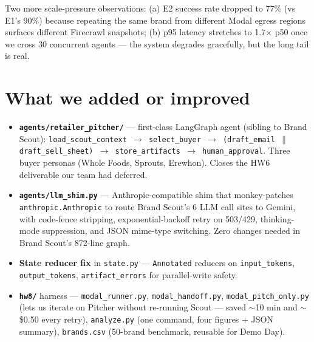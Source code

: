 \documentclass[9pt]{extarticle}
\begin{document}
Two more scale-pressure observations: (a) E2 success rate dropped to 77\% (vs E1's 90\%) because repeating the same brand from different Modal egress regions surfaces different Firecrawl snapshots; (b) p95 latency stretches to 1.7$\times$ p50 once we cross 30 concurrent agents --- the system degrades gracefully, but the long tail is real.

\section*{What we added or improved}
\begin{itemize}
  \item \textbf{\texttt{agents/retailer\_pitcher/}} --- first-class LangGraph agent (sibling to Brand Scout): \texttt{load\_scout\_context $\to$ select\_buyer $\to$ (draft\_email $\parallel$ draft\_sell\_sheet) $\to$ store\_artifacts $\to$ human\_approval}. Three buyer personas (Whole Foods, Sprouts, Erewhon). Closes the HW6 deliverable our team had deferred.
  \item \textbf{\texttt{agents/llm\_shim.py}} --- Anthropic-compatible shim that monkey-patches \texttt{anthropic.Anthropic} to route Brand Scout's 6 LLM call sites to Gemini, with code-fence stripping, exponential-backoff retry on 503/429, thinking-mode suppression, and JSON mime-type switching. Zero changes needed in Brand Scout's 872-line graph.
  \item \textbf{State reducer fix} in \texttt{state.py} --- \texttt{Annotated} reducers on \texttt{input\_tokens}, \texttt{output\_tokens}, \texttt{artifact\_errors} for parallel-write safety.
  \item \textbf{\texttt{hw8/}} harness --- \texttt{modal\_runner.py}, \texttt{modal\_handoff.py}, \texttt{modal\_pitch\_only.py} (lets us iterate on Pitcher without re-running Scout --- saved $\sim$10 min and $\sim$\$0.50 every retry), \texttt{analyze.py} (one command, four figures + JSON summary), \texttt{brands.csv} (50-brand benchmark, reusable for Demo Day).
\end{itemize}
\end{document}
